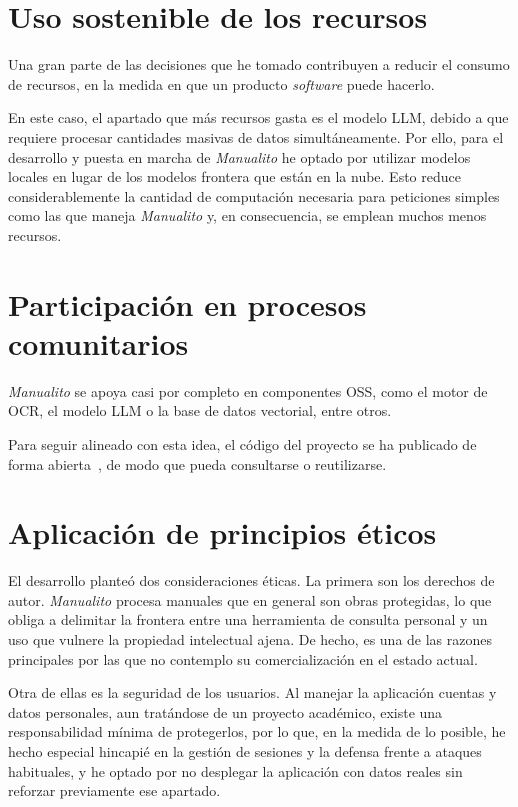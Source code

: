 \section{Uso sostenible de los recursos}
Una gran parte de las decisiones que he tomado contribuyen a reducir el consumo
de recursos, en la medida en que un producto \textit{software} puede hacerlo.

En este caso, el apartado que más recursos gasta es el modelo \ac{LLM}, debido a
que requiere procesar cantidades masivas de datos simultáneamente. Por ello,
para el desarrollo y puesta en marcha de \textit{Manualito} he optado por
utilizar modelos locales en lugar de los modelos frontera que están en la nube. Esto
reduce considerablemente la cantidad de computación necesaria para peticiones simples
como las que maneja \textit{Manualito} y, en consecuencia, se emplean muchos menos recursos.

\section{Participación en procesos comunitarios}
\textit{Manualito} se apoya casi por completo en componentes \ac{OSS}, como el motor
de \ac{OCR}, el modelo \ac{LLM} o la base de datos vectorial, entre otros.

Para seguir alineado con esta idea, el código del proyecto se ha publicado de forma
abierta~\cite{manualito_github}, de modo que pueda consultarse o reutilizarse.

\section{Aplicación de principios éticos}
El desarrollo planteó dos consideraciones éticas. La primera son los derechos de
autor. \textit{Manualito} procesa manuales que en general son obras protegidas, lo que obliga
a delimitar la frontera entre una herramienta de consulta personal y un uso que
vulnere la propiedad intelectual ajena. De hecho, es una de las razones principales por las
que no contemplo su comercialización en el estado actual.

Otra de ellas es la seguridad de los usuarios. Al manejar la aplicación cuentas y datos personales,
aun tratándose de un proyecto académico, existe una responsabilidad mínima de protegerlos, por lo que, en la medida de lo posible, he hecho especial hincapié en la gestión de sesiones
y la defensa frente a ataques habituales, y he optado por no desplegar la aplicación con
datos reales sin reforzar previamente ese apartado.
